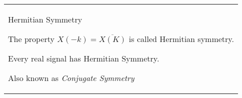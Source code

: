 \begin{tabular}{@{}L@{}}
Hermitian Symmetry

The property $X(-k) = \overline{X(K)}$ is called Hermitian symmetry.

Every real signal has Hermitian Symmetry. 

Also known as \textit{Conjugate Symmetry}
\end{tabular}
